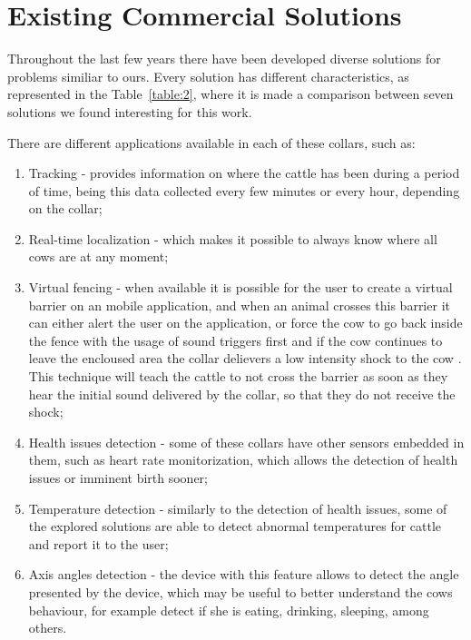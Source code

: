 


\section{Existing Commercial Solutions}
\label{sec:existing_commercial_solutions}
Throughout the last few years there have been developed diverse solutions for problems similiar
to ours. Every solution has different characteristics, as represented in the Table~\ref{table:2},
where it is made a comparison between seven solutions we found interesting for this work.

There are different applications available in each of these collars, such as:
\begin{enumerate}
      \item Tracking - provides information on where the cattle has been during a period of
            time, being this data collected every few minutes or every hour, depending on the
            collar;
      \item Real-time localization - which makes it possible to always know where all cows
            are at any moment;
      \item Virtual fencing - when available it is possible for the user to create a virtual
            barrier on an mobile application, and when an animal crosses this barrier it can
            either alert the user on the application, or force the cow to go back inside the
            fence with the usage of sound triggers first and if the cow continues to leave the
            encloused area the collar delievers a low intensity shock to the cow \cite{Golinski2022}.
            This technique will teach the cattle to not cross the barrier as soon as they hear
            the initial sound delivered by the collar, so that they do not receive the shock;
      \item Health issues detection - some of these collars have other sensors embedded in them,
            such as heart rate monitorization, which allows the detection of health issues or
            imminent birth sooner;
      \item Temperature detection - similarly to the detection of health issues, some of the
            explored solutions are able to detect abnormal temperatures for cattle and report
            it to the user;
      \item Axis angles detection - the device with this feature allows to detect the angle
            presented by the device, which may be useful to better understand the cows
            behaviour, for example detect if she is eating, drinking, sleeping, among others.
\end{enumerate}

